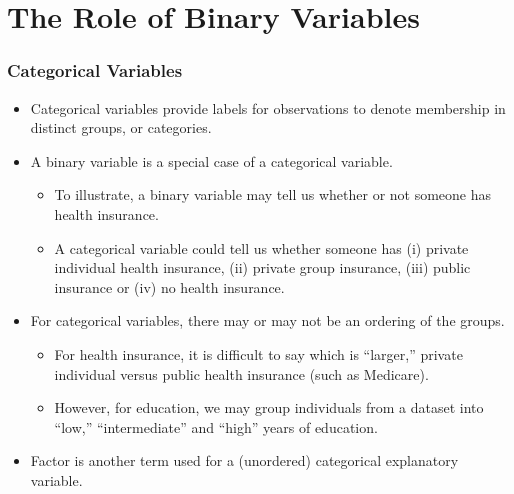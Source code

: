 
\section{The Role of Binary Variables}

\begin{frame}
 \frametitle{Categorical Variables}
 \begin{itemize}
   \item Categorical variables provide labels for observations to
denote membership in distinct groups, or categories.
 \item A binary variable is a special case of a categorical variable.
\begin{itemize}
 \item  To
illustrate, a binary variable may tell us whether or not someone has
health insurance.
 \item A categorical variable could tell us whether
someone has (i) private individual health insurance, (ii) private
group insurance, (iii) public insurance or (iv) no health insurance.
\end{itemize}
 \item For categorical variables, there may or may not be an ordering of
the groups.
\begin{itemize}
 \item For health insurance, it is difficult to say which is
``larger,'' private individual versus public health insurance (such
as Medicare).
 \item However, for education, we may group individuals from
a dataset into ``low,'' ``intermediate'' and ``high'' years of
education.
\end{itemize}
 \item Factor is another term used for a (unordered)
categorical explanatory variable.
 \end{itemize}
\end{frame}


